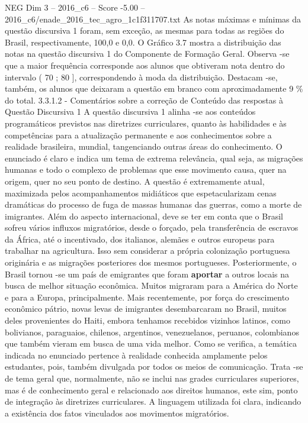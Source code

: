 \begin{textsample}{NEG Dim 3 – 2016\_c6 – Score -5.00 – 2016\_c6/enade\_2016\_tec\_agro\_1c1f311707.txt}
As notas máximas e mínimas da questão discursiva 1 foram, sem exceção, as mesmas para todas as regiões do Brasil, respectivamente, 100,0 e 0,0.
O Gráfico 3.7 mostra a distribuição das notas na questão discursiva 1 do Componente de Formação Geral.
Observa -se que a maior frequência corresponde aos alunos que obtiveram nota dentro do intervalo ( 70 ; 80 ], correspondendo à moda da distribuição.
Destacam -se, também, os alunos que deixaram a questão em branco com aproximadamente 9 \% do total. 3.3.1.2 - Comentários sobre a correção de Conteúdo das respostas à Questão Discursiva 1 A questão discursiva 1 alinha -se aos conteúdos programáticos previstos nas diretrizes curriculares, quanto às habilidades e às competências para a atualização permanente e aos conhecimentos sobre a realidade brasileira, mundial, tangenciando outras áreas do conhecimento.
O enunciado é claro e indica um tema de extrema relevância, qual seja, as migrações humanas e todo o complexo de problemas que esse movimento causa, quer na origem, quer no seu ponto de destino.
A questão é extremamente atual, maximizada pelos acompanhamentos midiáticos que espetacularizam cenas dramáticas do processo de fuga de massas humanas das guerras, como a morte de imigrantes.
Além do aspecto internacional, deve se ter em conta que o Brasil sofreu vários influxos migratórios, desde o forçado, pela transferência de escravos da África, até o incentivado, dos italianos, alemães e outros europeus para trabalhar na agricultura.
Isso sem considerar a própria colonização portuguesa originária e as migrações posteriores dos mesmos portugueses.
Posteriormente, o Brasil tornou -se um país de emigrantes que foram \textbf{aportar} a outros locais na busca de melhor situação econômica.
Muitos migraram para a América do Norte e para a Europa, principalmente.
Mais recentemente, por força do crescimento econômico pátrio, novas levas de imigrantes desembarcaram no Brasil, muitos deles provenientes do Haiti, embora tenhamos recebidos vizinhos latinos, como bolivianos, paraguaios, chilenos, argentinos, venezuelanos, peruanos, colombianos que também vieram em busca de uma vida melhor.
Como se verifica, a temática indicada no enunciado pertence à realidade conhecida amplamente pelos estudantes, pois, também divulgada por todos os meios de comunicação.
Trata -se de tema geral que, normalmente, não se inclui nas grades curriculares superiores, mas é de conhecimento geral e relacionado aos direitos humanos, este sim, ponto de integração às diretrizes curriculares.
A linguagem utilizada foi clara, indicando a existência dos fatos vinculados aos movimentos migratórios.

\end{textsample}
